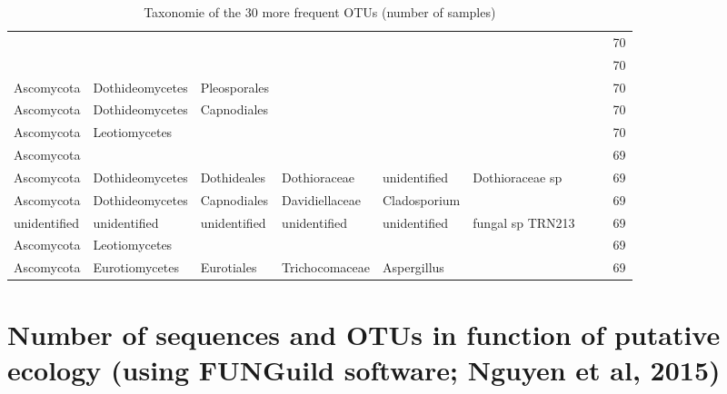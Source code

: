 \documentclass[12pt]{article}\usepackage[]{graphicx}\usepackage[]{color}
\numberwithin{figure}{section}
\begin{document}
\begin{landscape}
\begin{table}[ht]
\begin{tabular}{llllllllr}
   &  &  &  &  &  &  &  & 70 \\ 
   &  &  &  &  &  &  &  & 70 \\ 
  Ascomycota & Dothideomycetes & Pleosporales &  &  &  &  &  & 70 \\ 
  Ascomycota & Dothideomycetes & Capnodiales &  &  &  &  &  & 70 \\ 
  Ascomycota & Leotiomycetes &  &  &  &  &  &  & 70 \\ 
  Ascomycota &  &  &  &  &  &  &  & 69 \\ 
  Ascomycota & Dothideomycetes & Dothideales & Dothioraceae & unidentified & Dothioraceae sp &  &  & 69 \\ 
  Ascomycota & Dothideomycetes & Capnodiales & Davidiellaceae & Cladosporium &  &  &  & 69 \\ 
  unidentified & unidentified & unidentified & unidentified & unidentified & fungal sp TRN213 &  &  & 69 \\ 
  Ascomycota & Leotiomycetes &  &  &  &  &  &  & 69 \\ 
  Ascomycota & Eurotiomycetes & Eurotiales & Trichocomaceae & Aspergillus &  &  &  & 69 \\ 
   \hline
\end{tabular}
\endgroup
\caption{Taxonomie of the 30 more frequent OTUs (number of samples)} 
\end{table}

\end{landscape}


\section{Number of sequences and OTUs in function of putative ecology (using FUNGuild software; Nguyen et al, 2015)}
\end{document}

